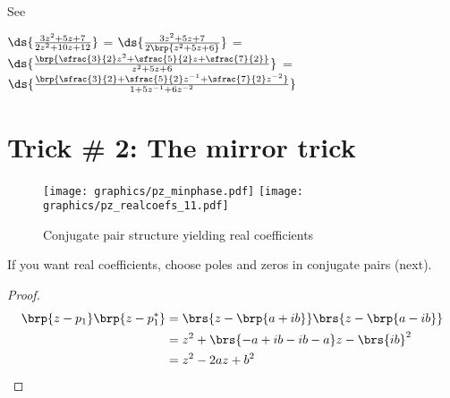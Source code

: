 \begin{example}
See 

$\ds{\frac{3z^2 + 5z + 7}{2z^2 + 10z + 12}}$
=
$\ds{\frac{3z^2 + 5z + 7}{2\brp{z^2 + 5z + 6}}}$
=
$\ds{\frac{\brp{\sfrac{3}{2}z^2 + \sfrac{5}{2}z + \sfrac{7}{2}}}
               {z^2 + 5z + 6}}$
=
$\ds{\frac{\brp{\sfrac{3}{2} + \sfrac{5}{2}z^{-1} + \sfrac{7}{2}z^{-2}}}
               {1 + 5z^{-1} + 6z^{-2}}}$
\end{example}

\section*{Trick \# 2: The mirror trick}
\begin{figure}
  \centering
  \texttt{[image: graphics/pz\_minphase.pdf]}%
  \texttt{[image: graphics/pz\_realcoefs\_11.pdf]}
\caption{Conjugate pair structure yielding real coefficients\label{fig:realcoefs}}
\end{figure}

If you want real coefficients, choose poles and zeros in conjugate pairs (next).
\begin{proposition}
\end{proposition}
\begin{proof}
\begin{align*}
  \brp{z-p_1}\brp{z-p_1^*}
    &= \brs{z-\brp{a+ib}} \brs{z-\brp{a-ib}}
  \\&= z^2 +\brs{-a+ib-ib-a}z - \brs{ib}^2
  \\&= z^2 -2a z + b^2
\end{align*}
\end{proof}

